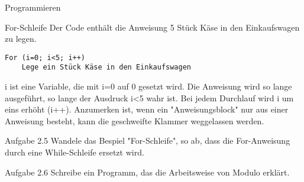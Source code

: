 \documentclass[presentation]{beamer}
\begin{document}
\begin{frame}[fragile,label={sec:orgheadline2}]{Programmieren}
\begin{block}{For-Schleife}
Der Code enthält die Anweisung 5 Stück Käse in den Einkaufswagen zu legen.

\label{orgexampleblock3}
\begin{verbatim}
For (i=0; i<5; i++)
    Lege ein Stück Käse in den Einkaufswagen
\end{verbatim}

i ist eine Variable, die mit i=0 auf 0 gesetzt wird. Die Anweisung wird so lange ausgeführt, so lange der Ausdruck i<5 wahr ist. Bei jedem Durchlauf wird i um eins erhöht (i++). Anzumerken ist, wenn ein "Anweisungsblock" nur aus einer Anweisung besteht, kann die geschweifte Klammer weggelassen werden.
\end{block}

\begin{block}{Aufgabe 2.5}
Wandele das Bespiel "For-Schleife", so ab, dass die For-Anweisung durch eine While-Schleife ersetzt wird.
\end{block}

\begin{block}{Aufgabe 2.6}
Schreibe ein Programm, das die Arbeitsweise von Modulo erklärt.
\end{block}
\end{frame}
\end{document}
